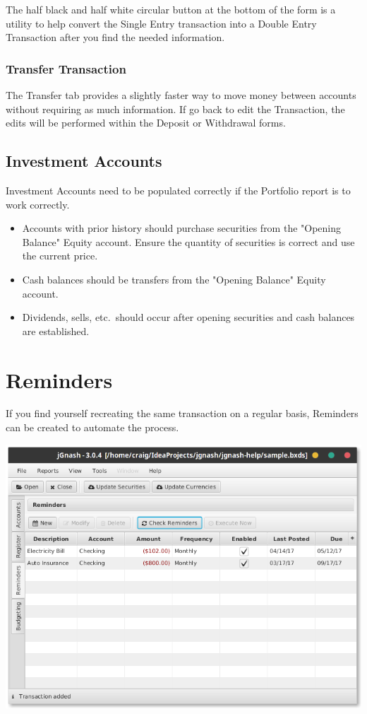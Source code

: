 \documentclass[letterpaper,12pt]{book}
\begin{document}
    The half black and half white circular button at the bottom of the form is a utility to help convert the
    Single Entry transaction into a Double Entry Transaction after you find the needed information.

    \subsection{Transfer Transaction}
    The Transfer tab provides a slightly faster way to move money between accounts without requiring as much information.
    If go back to edit the Transaction, the edits will be performed within the Deposit or Withdrawal forms.
    
    \section{Investment Accounts}
    Investment Accounts need to be populated correctly if the Portfolio report is to work correctly.

    \begin{itemize}
        \item Accounts with prior history should purchase securities from the "Opening Balance" Equity account. Ensure the quantity of
        securities is correct and use the current price.
        \item Cash balances should be transfers from the "Opening Balance" Equity account.
        \item Dividends, sells, etc.\ should occur after opening securities and cash balances are established.
    \end{itemize}

    \chapter{Reminders}
    If you find yourself recreating the same transaction on a regular basis, Reminders can be created to automate the process.

    \includegraphics[width=0.8\linewidth]{images/reminders}
\end{document}

